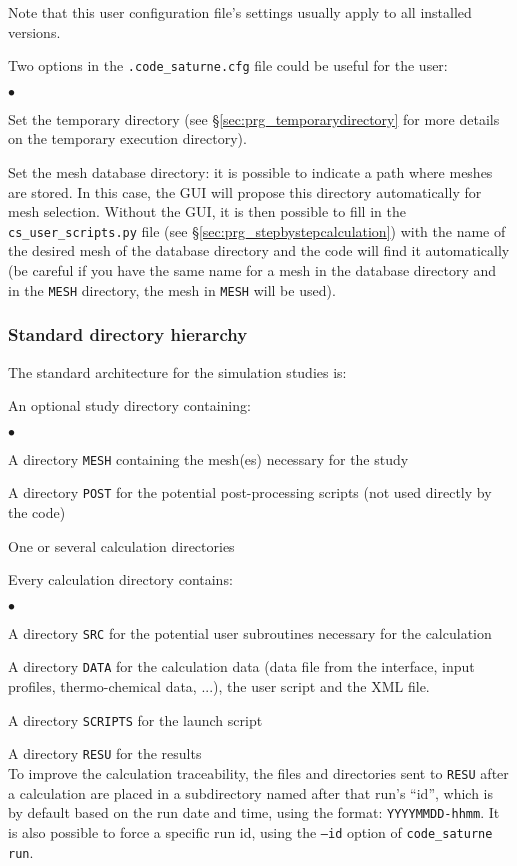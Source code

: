 Note that this user configuration file's settings usually apply to all installed \CS versions.

Two options in the \texttt{.code\_saturne.cfg} file could be useful for the user:
\begin{list}{$\bullet$}{}
\item Set the temporary directory (see \S\ref{sec:prg_temporarydirectory} for more details on the temporary execution directory).
\item Set the mesh database directory: it is possible to indicate a path where meshes are stored.
In this case, the GUI will propose this directory automatically for mesh selection. Without the GUI, it is
then possible to fill in the \texttt{cs\_user\_scripts.py} file (see \S\ref{sec:prg_stepbystepcalculation})
with the name of the desired mesh of the database directory and the code will
find it automatically (be careful if you have the same name for a mesh in the database directory
and in the \texttt{MESH} directory, the mesh in \texttt{MESH} will be used).
\end{list}

\subsubsection{Standard directory hierarchy}
\label{sec:prg_architecture}%
The standard architecture for the simulation studies is:

\noindent
An optional study directory containing:
\begin{list}{$\bullet$}{}
\item A directory \texttt{MESH} containing the mesh(es)
      necessary for the study
\item A directory \texttt{POST} for the potential post-processing scripts (not
used directly by the code)
\item One or several calculation directories
\end{list}

\noindent
Every calculation directory contains:
\begin{list}{$\bullet$}{}
\item A directory \texttt{SRC} for the potential user subroutines
      necessary for the calculation
\item A directory \texttt{DATA} for the calculation data (data
      file from the interface, input profiles, thermo-chemical data, ...), the user script and the XML file.
\item A directory \texttt{SCRIPTS} for the launch script
\item A directory \texttt{RESU} for the results\\
To improve the calculation traceability, the files and directories
sent to \texttt{RESU} after a calculation are  placed in a subdirectory
named after that run's ``id'', which is by default based on the run date
and time, using the format: \texttt{YYYYMMDD-hhmm}.
It is also possible to force a specific run id, using the \texttt{--id}
option of \texttt{code\_saturne run}.
\end{list}

